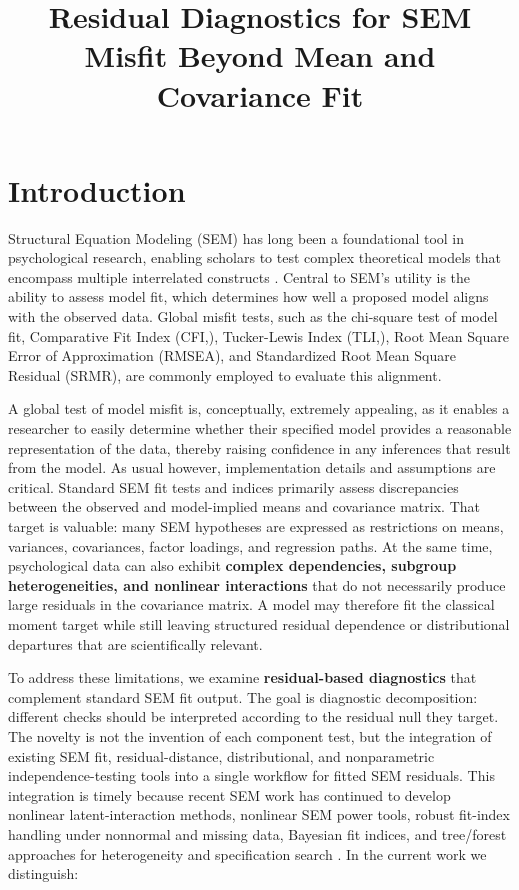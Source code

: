 \documentclass[floatsintext,a4paper]{apa7} %
\title{Residual Diagnostics for SEM Misfit Beyond Mean and Covariance Fit}
\begin{document}
	\maketitle
	
	\section{Introduction}
	Structural Equation Modeling (SEM) has long been a foundational tool in psychological research, enabling scholars to test complex theoretical models that encompass multiple interrelated constructs \citep{bollen1989structural}. Central to SEM's utility is the ability to assess model fit, which determines how well a proposed model aligns with the observed data. Global misfit tests, such as the chi-square test of model fit, Comparative Fit Index (CFI,\cite{bentler1990comparative}), Tucker-Lewis Index (TLI,\cite{hu1999cutoff}), Root Mean Square Error of Approximation (RMSEA), and Standardized Root Mean Square Residual (SRMR), are commonly employed to evaluate this alignment.
	
	A global test of model misfit is, conceptually, extremely appealing, as it enables a researcher to easily determine whether their specified model provides a reasonable representation of the data, thereby raising confidence in any inferences that result from the model. As usual however, implementation details and assumptions are critical. Standard SEM fit tests and indices primarily assess discrepancies between the observed and model-implied means and covariance matrix. That target is valuable: many SEM hypotheses are expressed as restrictions on means, variances, covariances, factor loadings, and regression paths. At the same time, psychological data can also exhibit \textbf{complex dependencies, subgroup heterogeneities, and nonlinear interactions} \citep{micceri1989unicorn} that do not necessarily produce large residuals in the covariance matrix. A model may therefore fit the classical moment target while still leaving structured residual dependence or distributional departures that are scientifically relevant.
	
	To address these limitations, we examine \textbf{residual-based diagnostics} that complement standard SEM fit output. The goal is diagnostic decomposition: different checks should be interpreted according to the residual null they target. The novelty is not the invention of each component test, but the integration of existing SEM fit, residual-distance, distributional, and nonparametric independence-testing tools into a single workflow for fitted SEM residuals. This integration is timely because recent SEM work has continued to develop nonlinear latent-interaction methods, nonlinear SEM power tools, robust fit-index handling under nonnormal and missing data, Bayesian fit indices, and tree/forest approaches for heterogeneity and specification search \citep{irmer2024estimating,cox2025comparing,jia2026obtaining,garnierVillarreal2020adapting,arnold2021score,silvaDiaz2025evaluation}. In the current work we distinguish:
	
\end{document}
